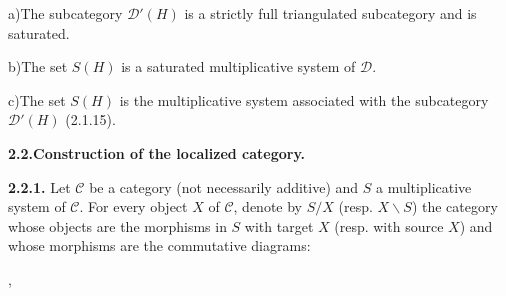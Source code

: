 \par\noindent\hspace*{2em}a)\enspace The subcategory $\mathcal D'(H)$ is a
strictly full triangulated subcategory and is saturated.

\par\noindent\hspace*{2em}b)\enspace The set $S(H)$ is a saturated
multiplicative system of $\mathcal D$.

\par\noindent\hspace*{2em}c)\enspace The set $S(H)$ is the multiplicative
system associated with the subcategory $\mathcal D'(H)$ (2.1.15).
\par\endgroup

\medskip
\noindent\textbf{2.2.\quad Construction of the localized category.}

\smallskip
\noindent\textbf{2.2.1.}\quad
{}%
Let $\mathcal C$ be a category (not necessarily additive) and $S$ a
multiplicative system of $\mathcal C$. For every object $X$ of $\mathcal C$,
denote by $S/X$ (resp. $X\backslash S$) the category whose objects are the
morphisms in $S$ with target $X$ (resp. with source $X$)
%
and whose morphisms are the commutative diagrams:

\begin{center}
  \quad ,
\end{center}

\endgroup
